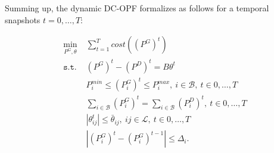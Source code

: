 Summing up, the dynamic DC-OPF formalizes as follows for a temporal snapshots $t = 0, \dots, T$:

\begin{equation}
    \begin{aligned}
        \min_{P^G, \theta}  & \sum_{t=1}^T\textit{cost}((P^G)^t) \\
        \texttt{s.t. }      & (P^G)^t - (P^D)^t = B\theta^t\\
                            & P_i^{min} \leq (P_i^G)^t \leq P_i^{max}, ~ i \in \mathcal{B}, ~ t \in 0, \dots, T \\ 
                            & \sum_{i \in \mathcal{B}} (P^G_i)^t = \sum_{i \in \mathcal{B}} (P^D_i)^t, ~ t \in 0, \dots, T \\
                            & |\theta_{ij}^t| \leq \bar{\theta}_{ij}, ~ ij \in \mathcal{L}, ~ t \in 0, \dots, T \\
                            & |(P^G_i)^t - (P^G_i)^{t-1}| \leq \Delta_i.\\
    \end{aligned}
    \label{eq:dyn-dc-opf}
\end{equation}
